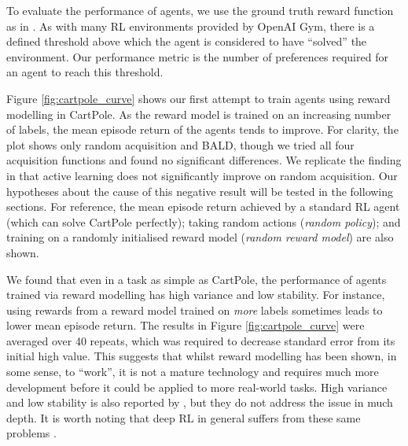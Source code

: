 \documentclass[11pt, a4paper, bibliography=totoc]{report}
\begin{document}
To evaluate the performance of agents, we use the ground truth reward function as in \cite{Christiano2017}. As with many RL environments provided by OpenAI Gym, there is a defined threshold above which the agent is considered to have ``solved'' the environment. Our performance metric is the number of preferences required for an agent to reach this threshold.

Figure \ref{fig:cartpole_curve} shows our first attempt to train agents using reward modelling in CartPole. As the reward model is trained on an increasing number of labels, the mean episode return of the agents tends to improve. For clarity, the plot shows only random acquisition and BALD, though we tried all four acquisition functions and found no significant differences. We replicate the finding in \cite{Christiano2017} that active learning does not significantly improve on random acquisition. Our hypotheses about the cause of this negative result will be tested in the following sections. For reference, the mean episode return achieved by a standard RL agent (which can solve CartPole perfectly); taking random actions (\textit{random policy}); and training on a randomly initialised reward model (\textit{random reward model}) are also shown.

We found that even in a task as simple as CartPole, the performance of agents trained via reward modelling has high variance and low stability. For instance, using rewards from a reward model trained on \textit{more} labels sometimes leads to lower mean episode return. The results in Figure \ref{fig:cartpole_curve} were averaged over 40 repeats, which was required to decrease standard error from its initial high value. This suggests that whilst reward modelling has been shown, in some sense, to ``work'', it is not a mature technology and requires much more development before it could be applied to more real-world tasks. High variance and low stability is also reported by \cite[p.~7]{Christiano2017}, but they do not address the issue in much depth. It is worth noting that deep RL in general suffers from these same problems \cite{rlblogpost}.
\end{document}
